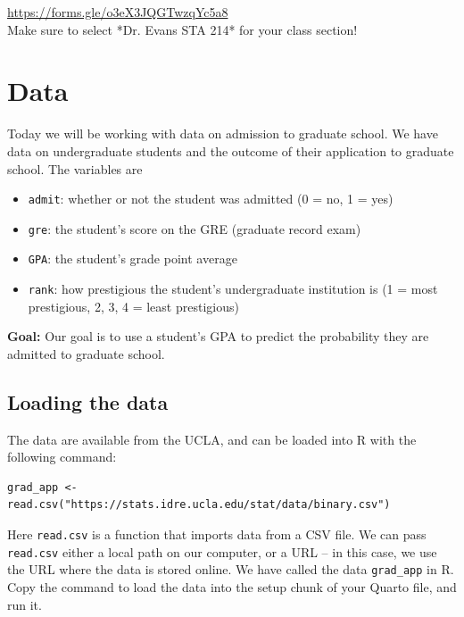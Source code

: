 \documentclass[11pt]{article}
\begin{document}
\url{https://forms.gle/o3eX3JQGTwzqYc5a8}\\

\noindent Make sure to select *Dr. Evans STA 214* for your class section!

\section*{Data}

Today we will be working with data on admission to graduate school. We have data on undergraduate students and the outcome of their application to graduate school. The variables are

\begin{itemize}
\item \texttt{admit}: whether or not the student was admitted (0 = no, 1 = yes)
\item \texttt{gre}: the student's score on the GRE (graduate record exam)
\item \texttt{GPA}: the student's grade point average
\item \texttt{rank}: how prestigious the student's undergraduate institution is (1 = most prestigious, 2, 3, 4 = least prestigious)
\end{itemize}

\noindent \textbf{Goal:} Our goal is to use a student's GPA to predict the probability they are admitted to graduate school.

\subsection*{Loading the data}

The data are available from the UCLA, and can be loaded into R with the following command:

\begin{verbatim}
grad_app <- read.csv("https://stats.idre.ucla.edu/stat/data/binary.csv")
\end{verbatim}

\noindent Here \texttt{read.csv} is a function that imports data from a CSV file. We can pass \texttt{read.csv} either a local path on our computer, or a URL -- in this case, we use the URL where the data is stored online. We have called the data \verb;grad_app; in R.\\

\noindent Copy the command to load the data into the setup chunk of your Quarto file, and run it.

\newpage
\end{document}
